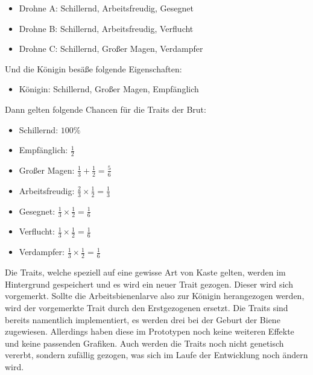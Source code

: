 \begin{itemize}
    \item Drohne A: Schillernd, Arbeitsfreudig, Gesegnet
    \item Drohne B: Schillernd, Arbeitsfreudig, Verflucht
    \item Drohne C: Schillernd, Großer Magen, Verdampfer
\end{itemize} Und die Königin besäße folgende Eigenschaften:

\begin{itemize}
    \item Königin: Schillernd, Großer Magen, Empfänglich
\end{itemize} Dann gelten folgende Chancen für die Traits der Brut:

\begin{itemize}
    \item Schillernd: $100\%$
    \item Empfänglich: $\frac{1}{2}$
    \item Großer Magen: $\frac{1}{3} + \frac{1}{2} = \frac{5}{6}$
    \item Arbeitsfreudig: $\frac{2}{3} \times \frac{1}{2} = \frac{1}{3}$
    \item Gesegnet: $\frac{1}{3} \times \frac{1}{2} = \frac{1}{6}$
    \item Verflucht: $\frac{1}{3} \times \frac{1}{2} = \frac{1}{6}$
    \item Verdampfer: $\frac{1}{3} \times \frac{1}{2} = \frac{1}{6}$
\end{itemize} Die Traits, welche speziell auf eine gewisse Art von Kaste gelten, werden im Hintergrund gespeichert und es wird ein neuer Trait gezogen. Dieser wird sich vorgemerkt. Sollte die Arbeitsbienenlarve also zur Königin herangezogen werden, wird der vorgemerkte Trait durch den Erstgezogenen ersetzt. Die Traits sind bereits namentlich implementiert, es werden drei bei der Geburt der Biene zugewiesen. Allerdings haben diese im Prototypen noch keine weiteren Effekte und keine passenden Grafiken. Auch werden die Traits noch nicht genetisch vererbt, sondern zufällig gezogen, was sich im Laufe der Entwicklung noch ändern wird.

